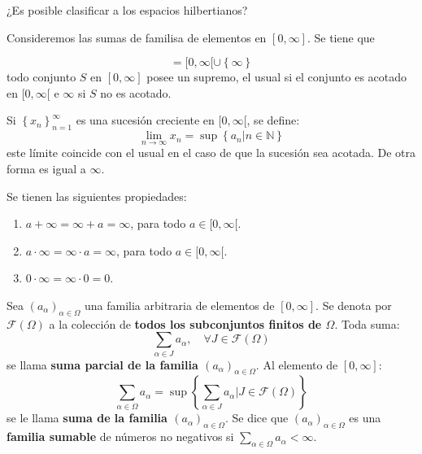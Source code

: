 \documentclass[12pt]{report}
\newcounter{it}
\theoremstyle{largebreak}
\begin{document}
    ¿Es posible clasificar a los espacios hilbertianos?

    Consideremos las sumas de familisa de elementos en $[0,\infty]$. Se tiene que

    \begin{equation*}
        [0,\infty]=[0,\infty[\cup\left\{\infty \right\}
    \end{equation*}
    todo conjunto $S$ en $[0,\infty]$ posee un supremo, el usual si el conjunto es acotado en $[0,\infty[$ e $\infty$ si $S$ no es acotado.

    Si $\left\{x_n \right\}_{n=1}^\infty$ es una sucesión creciente en $[0,\infty[$, se define:
    \begin{equation*}
        \lim_{n\rightarrow\infty}x_n=\sup\left\{a_n\big|n\in\mathbb{N} \right\}
    \end{equation*}
    este límite coincide con el usual en el caso de que la sucesión sea acotada. De otra forma es igual a $\infty$.

    Se tienen las siguientes propiedades:

    \begin{enumerate}
        \item $a+\infty=\infty+a=\infty$, para todo $a\in[0,\infty[$.
        \item $a\cdot \infty=\infty\cdot a=\infty$, para todo $a\in[0,\infty[$.
        \item $0\cdot\infty=\infty\cdot0=0$.
    \end{enumerate}

    \begin{mydef}
        Sea $\left(a_\alpha\right)_{\alpha\in\Omega}$ una familia arbitraria de elementos de $[0,\infty]$. Se denota por $\mathcal{F}(\Omega)$ a la colección de \textbf{todos los subconjuntos finitos de $\Omega$}. Toda suma:
        \begin{equation*}
            \sum_{\alpha\in J}a_\alpha,\quad\forall J\in\mathcal{F}(\Omega)
        \end{equation*}
        se llama \textbf{suma parcial de la familia $\left(a_\alpha\right)_{\alpha\in\Omega}$}. Al elemento de $[0,\infty]$:
        \begin{equation*}
            \sum_{\alpha\in\Omega}a_\alpha=\sup\left\{ \sum_{\alpha\in J}a_\alpha\big|J\in\mathcal{F}(\Omega) \right\}
        \end{equation*}
        se le llama \textbf{suma de la familia $\left(a_\alpha\right)_{\alpha\in\Omega}$}. Se dice que $\left(a_\alpha\right)_{\alpha\in\Omega}$ es una \textbf{familia sumable} de números no negativos si $\sum_{\alpha\in\Omega}a_\alpha<\infty$.
    \end{mydef}
\end{document}
